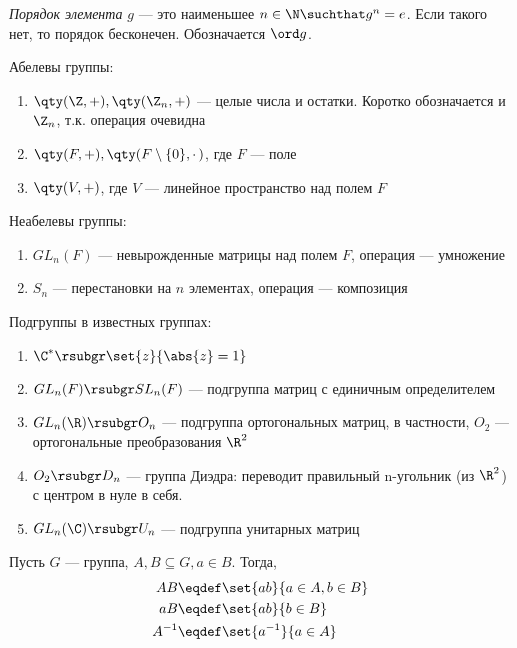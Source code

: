 \begin{definition}
  \emph{Порядок элемента} $g$ --- это наименьшее $n \in \N \suchthat g^n=e$. Если такого нет, то порядок бесконечен. Обозначается $\ord g$.
\end{definition}

\begin{examples}
  Абелевы группы:
  \begin{enumerate}
    \item $\qty(\Z, +), \qty(\Z_n, +)$ --- целые числа и остатки. Коротко обозначается \Z и $\Z_n$, т.\:к. операция очевидна
    \item $\qty(F, +), \qty(F\setminus\{0\}, \cdotp)$, где $F$ --- поле
    \item $\qty(V, +)$, где $V$ --- линейное пространство над полем $F$
  \end{enumerate}

  Неабелевы группы:
  \begin{enumerate}[resume]
    \item $GL_n(F)$ --- невырожденные матрицы над полем $F$, операция --- умножение
    \item $S_n$ --- перестановки на $n$ элементах, операция --- композиция
  \end{enumerate}

  Подгруппы в известных группах:
  \begin{enumerate}[resume]
    \item $\C^\ast \rsubgr \set{z}{\abs{z}=1}$
    \item $GL_n(F) \rsubgr SL_n(F)$ --- подгруппа матриц с единичным определителем
    \item $GL_n(\R) \rsubgr O_n$ --- подгруппа ортогональных матриц, в частности, $O_2$ --- ортогональные преобразования $\R^2$
    \item $O_2 \rsubgr D_n$ --- группа Диэдра: переводит правильный n-угольник (из $\R^2$) с центром в нуле в себя.
    \item $GL_n(\C) \rsubgr U_n$ --- подгруппа унитарных матриц
  \end{enumerate}
\end{examples}


\begin{definition}
  Пусть $G$ --- группа, $A,B\subseteq G, a\in B$. Тогда,
  \begin{align*}
    AB     & \eqdef \set{ab}{a\in A, b \in B} \\
    aB     & \eqdef \set{ab}{b \in B}         \\
    A^{-1} & \eqdef \set{a^{-1}}{a \in A}
  \end{align*}
\end{definition}

